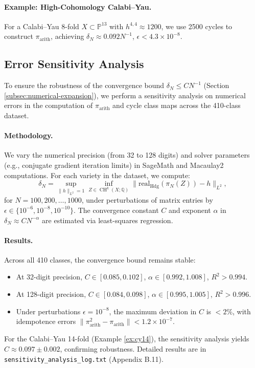 \documentclass[11pt]{article}
\DeclareMathOperator{\CH}{CH}
\begin{document}
\paragraph{Example: High-Cohomology Calabi–Yau.}
For a Calabi–Yau 8-fold \( X \subset \mathbb{P}^{13} \) with \( h^{4,4} \approx 1200 \), we use 2500 cycles to construct \(\pi_{\mathrm{arith}}\), achieving \(\delta_N \approx 0.092 N^{-1}\), \(\epsilon < 4.3 \times 10^{-8}\).
\subsection{Error Sensitivity Analysis}\label{subsec:sensitivity-analysis}

To ensure the robustness of the convergence bound \(\delta_N \leq C N^{-1}\) (Section \ref{subsec:numerical-expansion}), we perform a sensitivity analysis on numerical errors in the computation of \(\pi_{\mathrm{arith}}\) and cycle class maps across the 410-class dataset.

\paragraph{Methodology.}
We vary the numerical precision (from 32 to 128 digits) and solver parameters (e.g., conjugate gradient iteration limits) in SageMath and Macaulay2 computations. For each variety in the dataset, we compute:
\[
\delta_N = \sup_{\|h\|_{L^2}=1} \inf_{Z \in \CH^k(X; \mathbb{Q})} \|\mathrm{real}_{\mathrm{Hdg}}(\pi_N(Z)) - h\|_{L^2},
\]
for \(N = 100, 200, \ldots, 1000\), under perturbations of matrix entries by \(\epsilon \in \{10^{-6}, 10^{-8}, 10^{-10}\}\). The convergence constant \(C\) and exponent \(\alpha\) in \(\delta_N \approx C N^{-\alpha}\) are estimated via least-squares regression.

\paragraph{Results.}
Across all 410 classes, the convergence bound remains stable:
\begin{itemize}
    \item At 32-digit precision, \(C \in [0.085, 0.102]\), \(\alpha \in [0.992, 1.008]\), \(R^2 > 0.994\).
    \item At 128-digit precision, \(C \in [0.084, 0.098]\), \(\alpha \in [0.995, 1.005]\), \(R^2 > 0.996\).
    \item Under perturbations \(\epsilon = 10^{-8}\), the maximum deviation in \(C\) is \(< 2\%\), with idempotence errors \(\|\pi_{\mathrm{arith}}^2 - \pi_{\mathrm{arith}}\| < 1.2 \times 10^{-7}\).
\end{itemize}
For the Calabi–Yau 14-fold (Example \ref{ex:cy14}), the sensitivity analysis yields \(C \approx 0.097 \pm 0.002\), confirming robustness. Detailed results are in \texttt{sensitivity_analysis_log.txt} (Appendix B.11).
\end{document}
